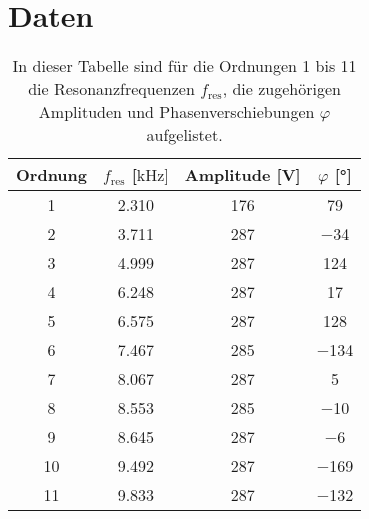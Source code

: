 \newpage
\section{Daten}
    \begin{table}[h]
        \centering
        \caption{In dieser Tabelle sind für die Ordnungen 1 bis 11 die Resonanzfrequenzen $f_{\text{res}}$, die zugehörigen Amplituden und Phasenverschiebungen $\varphi$ aufgelistet.}
        \label{tab:phasenverschiebung}
        \begin{tabular}{c c c c}
        \toprule
        {Ordnung} & {$f_{\text{res}}$ [$\si{\kilo\hertz}]$} & {Amplitude [V]} & {$\varphi$ [°]} \\
        \midrule
        \num{1}  &  \num{2.310}  &  \num{176}  & \num{79}    \\
        \num{2}  &  \num{3.711}   &  \num{287}  & \num{-34}  \\
        \num{3}  &  \num{4.999}   &  \num{287}  & \num{124}  \\
        \num{4}  &  \num{6.248}   &  \num{287}  & \num{17}   \\
        \num{5}  &  \num{6.575}   &  \num{287}  & \num{128}  \\
        \num{6}  &  \num{7.467}   &  \num{285}  & \num{-134} \\
        \num{7}  &  \num{8.067}   &  \num{287}  & \num{5}    \\
        \num{8}  &  \num{8.553}   &  \num{285}  & \num{-10}  \\
        \num{9}  &  \num{8.645}   &  \num{287}  & \num{-6}   \\
        \num{10} &  \num{9.492}   &  \num{287}  & \num{-169} \\   
        \num{11} &  \num{9.833}   &  \num{287}  & \num{-132} \\                    
        \bottomrule
        \end{tabular}
    \end{table}

    \FloatBarrier

